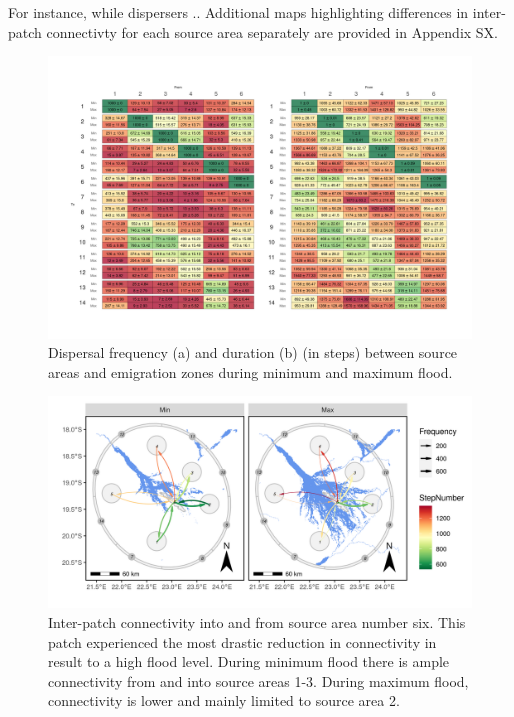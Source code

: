 \documentclass[abstract=on,10pt,a4paper,bibliography=totocnumbered]{article}
\begin{document}
For instance, while dispersers .. Additional maps highlighting differences in
inter-patch connectivty for each source area separately are provided in Appendix
SX.

\begin{figure}
  \begin{center}
  \includegraphics[width = \textwidth]{99_IPCTable.png}
  \caption{Dispersal frequency (a) and duration (b) (in steps) between source
  areas and emigration zones during minimum and maximum flood.}
  \label{IPCTable}
  \end{center}
\end{figure}

\begin{figure}
  \begin{center}
  \includegraphics[width = \textwidth]{99_Interpatch.png}
  \caption{Inter-patch connectivity into and from source area number six. This
  patch experienced the most drastic reduction in connectivity in result to a
  high flood level. During minimum flood there is ample connectivity from and
  into source areas 1-3. During maximum flood, connectivity is lower and mainly
  limited to source area 2.}
  \label{Interpatch}
  \end{center}
\end{figure}
\end{document}
